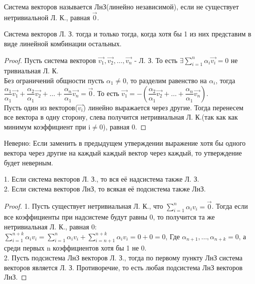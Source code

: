 	\begin{definition}
		Система векторов называется ЛнЗ(линейно независимой), если не существует нетривиальной Л. К., равная $\vec{0}$.
	\end{definition}
	\begin{proposition}
		Система векторов Л. З. тогда и только тогда, когда хотя бы 1 из них представим в виде линейной комбинации остальных.
\end{proposition}
\begin{proof}
		Пусть система векторов \(\vec{v_1}, \vec{v_2}, \ldots, \vec{v_n}\) - Л. З. То есть \(\exists \sum_{i=1}^{n}\alpha_i\vec{v_i} = 0\) не тривиальная Л. К. \\
		Без ограничений общности пусть $\alpha_1\ne0$, то разделим равенство на $\alpha_i$, тогда \(\dfrac{\alpha_1}{\alpha_1}\vec{v_1}+\dfrac{\alpha_2}{\alpha_1}\vec{v_2}+
		\ldots+\dfrac{\alpha_n}{\alpha_1}\vec{v_n} = \vec{0}\). То есть \(\vec{v_1} = - (\dfrac{\alpha_2}{\alpha_1}\vec{v_2}+\ldots+\dfrac{\alpha_n}{\alpha_1}\vec{v_n})\). \\
		Пусть один из векторов($\vec{v_i}$) линейно выражается через другие. Тогда перенесем все вектора в одну сторону, слева получится нетривиальная Л. К.(так как как минимум коэффициент при i$\ne$0), равная 0.
\end{proof}
\begin{note}
		Неверно: Если заменить в предыдущем утверждении выражение хотя бы одного вектора через другие на каждый каждый вектор через каждый, то утверждение будет неверным. 
\end{note}
\begin{proposition}
		1. Если система векторов Л. З., то вся её надсистема также Л. З. \\
		2. Если система векторов ЛнЗ, то всякая её подсистема также ЛнЗ.
\end{proposition}
\begin{proof}
		1. Пусть существует нетривиальная Л. К., что \(\sum_{i=1}^{n}\alpha_iv_i = \vec{0}\). Тогда если все коэффициенты при надсистеме будут равны 0, то получится та же нетривиальная Л. К., равная 0: \(\sum_{i=1}^{n+k}\alpha_iv_i = \sum_{i=1}^{n}\alpha_iv_i + \sum_{i=n+1}^{n+k}\alpha_iv_i = 0 + 0 = 0\), Где \(\alpha_{n+1}, \ldots, \alpha_{n+k} = 0\), а среди первых n коэффициентов хотя бы 1 не 0. \\
		2. Пусть подсистема ЛнЗ векторов Л. З., тогда по первому пункту ЛнЗ система векторов является Л. З. Противоречие, то есть любая подсистема ЛнЗ векторов ЛнЗ.
\end{proof}
